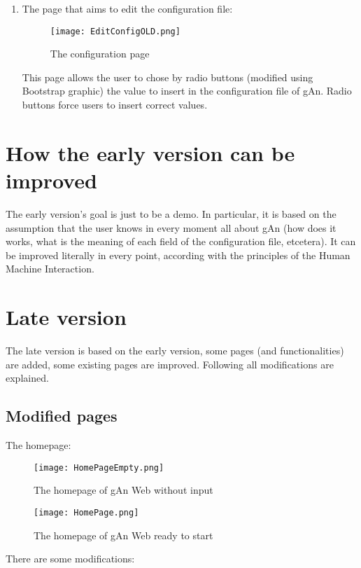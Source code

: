 \begin{enumerate}
\item The page that aims to edit the configuration file:

\begin{figure}[H]
\centering
\texttt{[image: EditConfigOLD.png]}  
\caption{The configuration page}
\end{figure}   

This page allows the user to chose by radio buttons (modified using Bootstrap graphic) the value to insert in the configuration file of gAn. Radio buttons force users to insert correct values.    

\end{enumerate}

\section{How the early version can be improved}
The early version's goal is just to be a demo. In particular, it is based on the assumption that the user knows in every moment all about gAn (how does it works,  what is the meaning of each field of the configuration file, etcetera). It can be improved literally in every point, according with the principles of the Human Machine Interaction.


\section{Late version}

The late version is based on the early version, some pages (and functionalities) are added, some existing pages are improved. Following all modifications are explained.

\subsection{Modified pages}
The homepage:

\begin{figure}[H]
\centering
\texttt{[image: HomePageEmpty.png]} 
\caption{The homepage of gAn Web without input}
\end{figure}


\begin{figure}[H]
\centering
\texttt{[image: HomePage.png]} 
\caption{The homepage of gAn Web ready to start}
\end{figure}

There are some modifications:

